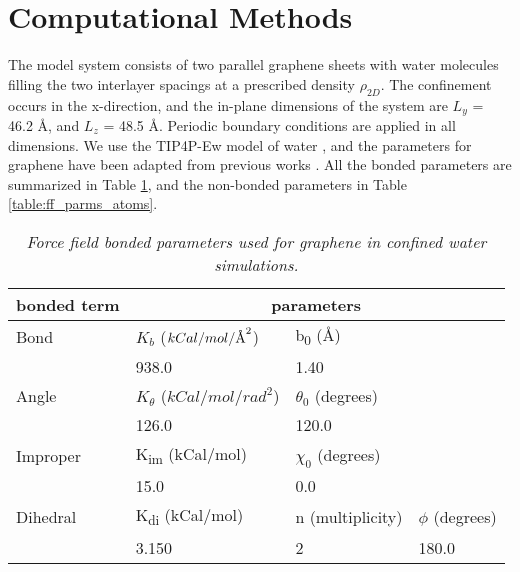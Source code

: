 \documentclass[journal=acsnano,manuscript=article]{achemso}
\newcommand{\angstrom}{\textup{\AA}}
\begin{document}
\clearpage
\clearpage
\section{Computational Methods}
	
	The model system consists of two parallel graphene sheets with water molecules filling the two interlayer spacings at a prescribed density \(\rho_{2D}\). The confinement occurs in the x-direction, and the in-plane dimensions of the system are \(L_y\) = 46.2 \r A, and  \(L_z\) = 48.5 \r A. Periodic boundary conditions are applied in all dimensions. We use the TIP4P-Ew model of water \cite{Horn2004}, and the parameters for graphene have been adapted from previous works \cite{Hummer2001,Patra2009}. All the bonded parameters are summarized in Table \ref{table:ff_parms}, and the non-bonded parameters in Table \ref{table:ff_parms_atoms}. 
	
	\begin{table}[ht!]
		\caption{\textit{Force field bonded parameters used for graphene in confined water simulations.}}
		\label{table:ff_parms}
		\centering
		\begin{tabular}{  l |  l l l } \hline
			\textbf{bonded term}  &\multicolumn{3}{c}{\textbf{parameters}} \\ \hline
			Bond  & \(K_b\)  (\(kCal/mol/\angstrom^2\))      & b\textsubscript{0}  (\r A)  &  \\ %
			   & 938.0         & 1.40            &    \\   \hline
			Angle & \(K_{\theta}\)  (\(kCal/mol/rad^2\)) & \(\theta_0\) (degrees)   &          \\ 
			  & 126.0         & 120.0           &         \\ \hline
			Improper   & K\textsubscript{im} (kCal/mol)       & \(\chi_0\) (degrees)     &          \\ 
			 & 15.0          & 0.0             &          \\ \hline
			Dihedral      & K\textsubscript{di} (kCal/mol)       & n (multiplicity) & \(\phi\) (degrees)\\ 
			 & 3.150         & 2               & 180.0  \\  \hline
		\end{tabular}
	\end{table}
	
\end{document}
